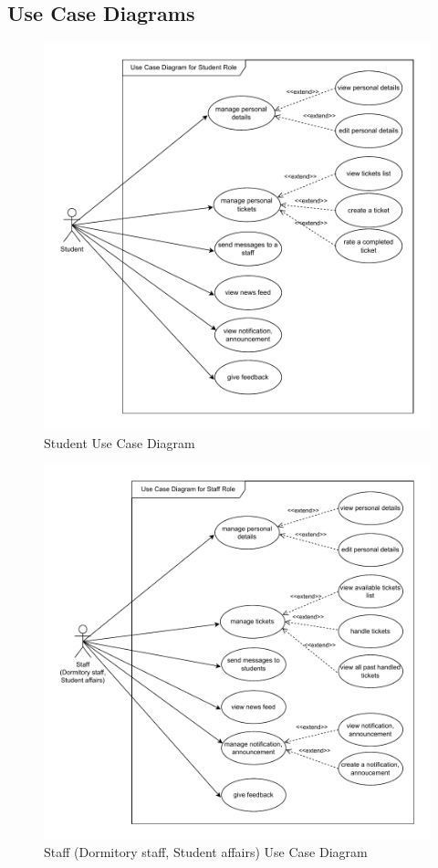 \subsection{Use Case Diagrams}
	\begin{figure}[H]
		\centering
		\includegraphics[width=0.82\columnwidth]{graphics/student use case.pdf}
		\caption{Student Use Case Diagram}
		\label{fig:student-use-case}
	\end{figure}
	
	
	
	\begin{figure}[H]
		\centering
		\includegraphics[width=0.9\columnwidth]{graphics/staff use case.pdf}
		\caption{Staff (Dormitory staff, Student affairs) Use Case Diagram}
		\label{fig:staff-use-case}
	\end{figure}
	

